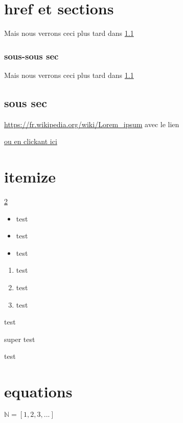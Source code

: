 \documentclass[french,titlepage] {article}
\begin{document}
\section{href et sections}

Mais nous verrons ceci plus tard dans 
\ref{sectionettiquete}
\subsubsection{sous-sous sec}
\blindtext

Mais nous verrons ceci plus tard dans \ref{sectionettiquete}

\subsection{sous sec}

\label{sectionettiquete}
\url{https://fr.wikipedia.org/wiki/Lorem_ipsum}
avec le lien 

\href{https://fr.wikipedia.org/wiki/Lorem_ipsum}{ou en clickant ici}


\section{itemize}

\label{ref2}
\ref{ref2}
\begin{itemize}
\item test
\item test
\item test
\end{itemize}
\begin{enumerate}
\item test
\item test
\item test
\end{enumerate}
\begin{description}
\item test
\item{super} test
\item test
\end{description}



\section{equations}
$ \mathbb{N} = [1,2,3,...]$
\end{document}
